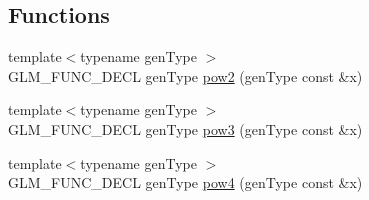 \subsection*{Functions}
\begin{DoxyCompactItemize}
\item 
{\footnotesize template$<$typename gen\+Type $>$ }\\G\+L\+M\+\_\+\+F\+U\+N\+C\+\_\+\+D\+E\+C\+L gen\+Type \hyperlink{group__gtx__optimum__pow_ga19aaff3213bf23bdec3ef124ace237e9}{pow2} (gen\+Type const \&x)
\item 
{\footnotesize template$<$typename gen\+Type $>$ }\\G\+L\+M\+\_\+\+F\+U\+N\+C\+\_\+\+D\+E\+C\+L gen\+Type \hyperlink{group__gtx__optimum__pow_ga35689d03cd434d6ea819f1942d3bf82e}{pow3} (gen\+Type const \&x)
\item 
{\footnotesize template$<$typename gen\+Type $>$ }\\G\+L\+M\+\_\+\+F\+U\+N\+C\+\_\+\+D\+E\+C\+L gen\+Type \hyperlink{group__gtx__optimum__pow_gacef0968763026e180e53e735007dbf5a}{pow4} (gen\+Type const \&x)
\end{DoxyCompactItemize}
